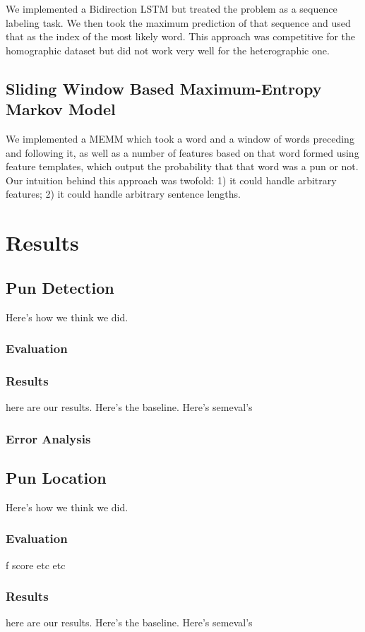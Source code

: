 \documentclass{article}
\begin{document}
We implemented a Bidirection LSTM but treated the problem as a sequence labeling
task. We then took the maximum prediction of that sequence and used that as the
index of the most likely word. This approach was competitive for the homographic
dataset but did not work very well for the heterographic one.

\subsection{Sliding Window Based Maximum-Entropy Markov Model}

We implemented a MEMM which took a word and a window of words preceding and
following it, as well as a number of features based on that word formed using
feature templates, which output the probability that that word was a pun or not.
Our intuition behind this approach was twofold: 1) it could handle arbitrary
features; 2) it could handle arbitrary sentence lengths.

\section{Results}\label{results}

\subsection{Pun Detection}
Here's how we think we did.
\subsubsection{Evaluation}
\subsubsection{Results}
here are our results. Here's the baseline. Here's semeval's

\subsubsection{Error Analysis}

\subsection{Pun Location}
Here's how we think we did.
\subsubsection{Evaluation}
f score etc etc
\subsubsection{Results}
here are our results. Here's the baseline. Here's semeval's
\end{document}
